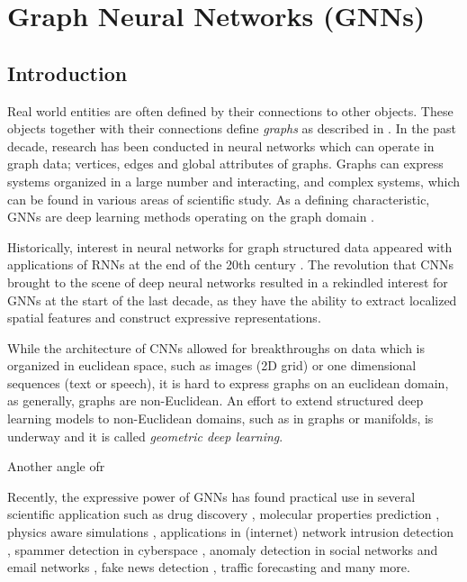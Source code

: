 \chapter{Graph Neural Networks (GNNs)} \label{GNN}

\section{Introduction}

Real world entities are often defined by their connections to other
objects. These objects together with their connections define
\textit{graphs} as described in . In the past decade,
research has been conducted in neural networks \cite{article:TGNNM}
which can operate in graph data; vertices, edges and global attributes
of graphs. Graphs can express systems organized in a large number and
interacting, and complex systems, which can be found in various areas
of scientific study. As a defining characteristic, GNNs are deep
learning methods operating on the graph domain \cite{article:zhou}.

Historically, interest in neural networks for graph structured data
appeared with applications of RNNs at the end of the 20th century
\cite{article:sperduti}. The revolution that CNNs brought to the
scene of deep neural networks resulted in a rekindled interest for
GNNs at the start of the last decade, as they have the ability to
extract localized spatial features and construct expressive representations.

While the architecture of CNNs allowed for breakthroughs on data which
is organized in euclidean space, such as images (2D grid) or
one dimensional sequences (text or speech), it is hard to express
graphs on an euclidean domain, as generally, graphs are non-Euclidean.
An effort to extend structured deep learning models to non-Euclidean
domains, such as in graphs or manifolds, is underway and it is called
\textit{geometric deep learning}\cite{article:geomDeep}. 

Another angle ofr

Recently, the expressive power of GNNs has found practical use in
several scientific application such as drug discovery
\cite{article:xiong,article:bognini}, molecular properties prediction
\cite{article:wieder}, physics aware simulations \cite{article:sanchez},
applications in (internet) network intrusion detection \cite{article:weng},
spammer detection in cyberspace \cite{article:zhiwei}, anomaly
detection in social networks and email networks \cite{article:chaudhary},
fake news detection \cite{article:monti}, traffic forecasting \cite{article:jiang}
and many more. 

